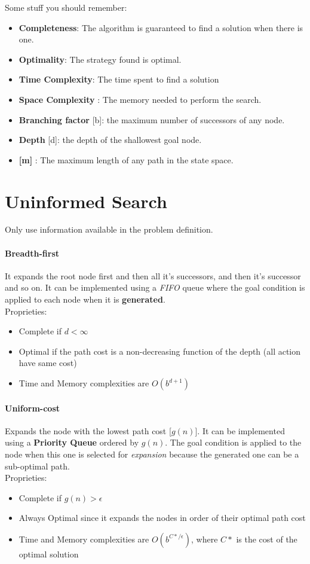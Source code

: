 \documentclass[10pt,a4paper]{article}
\begin{document}
Some stuff you should remember:
\begin{itemize}
\item \textbf{Completeness}: The algorithm is guaranteed to find a solution when there is one.
\item \textbf{Optimality}: The strategy found is optimal.
\item \textbf{Time Complexity}: The time spent to find a solution
\item \textbf{Space Complexity} : The memory needed to perform the search.
\item \textbf{Branching factor} [b]: the maximum number of successors of any node.
\item \textbf{Depth} [d]: the depth of the shallowest goal node.
\item \textbf{[m]} : The maximum length of any path in the state space.
\end{itemize}



\newpage

\section{Uninformed Search}
Only use information available in the problem definition.

\paragraph{Breadth-first}
It expands the root node first and then all it's successors, and then it's successor and so on. It can be implemented using a \textit{FIFO} queue where the goal condition is applied to each node when it is \textbf{generated}.\\
Proprieties:
\begin{itemize}
\item Complete if $d<\infty$ 
\item Optimal if the path cost is a non-decreasing function of the depth (all action have same cost)
\item Time and Memory complexities are $O(b^{d+1})$
\end{itemize}

\paragraph{Uniform-cost}
Expands the node with the lowest path cost [$g(n)$]. It can be implemented using a \textbf{Priority Queue} ordered by $g(n)$. The goal condition is applied to the node when this one is selected for \textit{expansion} because the generated one can be a sub-optimal path.\\
Proprieties:
\begin{itemize}
\item Complete if $g(n)>\epsilon$
\item Always Optimal  since it expands the nodes in order of their optimal path cost
\item Time and Memory complexities are $O(b^{C*/\epsilon})$, where $C*$ is the cost of the optimal solution
\end{itemize}
\end{document}
